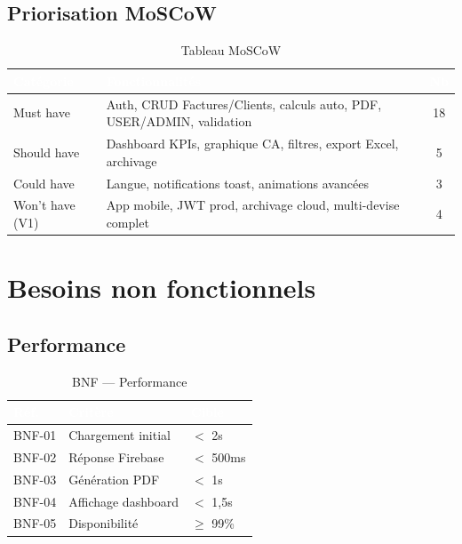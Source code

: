 \subsection{Priorisation MoSCoW}

\begin{table}[H]
\centering
\caption{Tableau MoSCoW}
\label{tab:moscow}
\begin{tabularx}{\textwidth}{|l|X|c|}
\hline
\rowcolor{emsiblue}\textcolor{white}{\textbf{Catégorie}} & \textcolor{white}{\textbf{Fonctionnalités}} & \textcolor{white}{\textbf{Nb}} \\
\hline
Must have & Auth, CRUD Factures/Clients, calculs auto, PDF, USER/ADMIN, validation & 18 \\
Should have & Dashboard KPIs, graphique CA, filtres, export Excel, archivage & 5 \\
Could have & Langue, notifications toast, animations avancées & 3 \\
Won't have (V1) & App mobile, JWT prod, archivage cloud, multi-devise complet & 4 \\
\hline
\end{tabularx}
\end{table}

\section{Besoins non fonctionnels}

\subsection{Performance}

\begin{table}[H]
\centering
\caption{BNF — Performance}
\label{tab:bnf_perf}
\begin{tabularx}{\textwidth}{|l|X|l|}
\hline
\rowcolor{emsiblue}\textcolor{white}{\textbf{Réf.}} & \textcolor{white}{\textbf{Critère}} & \textcolor{white}{\textbf{Cible}} \\
\hline
BNF-01 & Chargement initial & $<$ 2s \\
BNF-02 & Réponse Firebase & $<$ 500ms \\
BNF-03 & Génération PDF & $<$ 1s \\
BNF-04 & Affichage dashboard & $<$ 1,5s \\
BNF-05 & Disponibilité & $\geq$ 99\% \\
\hline
\end{tabularx}
\end{table}

